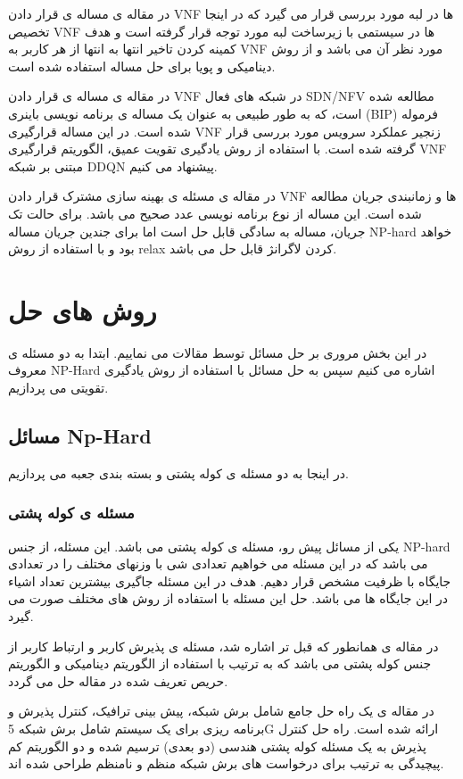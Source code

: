 در مقاله ی
\cite{cziva2018dynamic}
مساله ی قرار دادن VNF ها در لبه مورد بررسی قرار می گیرد که در اینجا تخصیص VNF ها در سیستمی با زیرساخت لبه مورد توجه قرار گرفته است و هدف کمینه کردن تاخیر انتها به انتها از هر کاربر به VNF مورد نظر آن می باشد و از روش دینامیکی و پویا برای حل مساله استفاده شده است. 

در مقاله ی
\cite{pei2019optimal}
مساله ی قرار دادن VNF در شبکه های فعال SDN/NFV مطالعه شده است، که به طور طبیعی به عنوان یک مساله ی برنامه نویسی باینری (BIP) فرموله شده است. 
در این مساله قرارگیری VNF زنجیر عملکرد سرویس مورد بررسی قرار گرفته شده است. 
با استفاده از روش یادگیری تقویت عمیق، الگوریتم قرارگیری VNF مبتنی بر شبکه DDQN  پیشنهاد می کنیم.

در مقاله ی
\cite{ren2020joint}
 مسئله ی بهینه سازی مشترک قرار دادن VNF ها و زمانبندی جریان مطالعه شده است.
 این مساله از نوع برنامه نویسی عدد صحیح می باشد.
 برای حالت تک جریان، مساله به سادگی قابل حل است اما برای جندین جریان مساله
 NP-hard
 خواهد بود و با استفاده از روش relax کردن لاگرانژ
 قابل حل می باشد.
\section{روش های حل}
در این بخش مروری بر حل مسائل توسط مقالات می نماییم.
ابتدا به دو مسئله ی معروف NP-Hard
اشاره می کنیم سپس به حل مسائل با استفاده از روش یادگیری تقویتی می پردازیم.
\subsection{مسائل Np-Hard}
در اینجا به دو مسئله ی کوله پشتی و بسته بندی جعبه می پردازیم.
\subsubsection{ مسئله ی کوله پشتی }
یکی از مسائل پیش رو، مسئله ی کوله پشتی 
می باشد.
این مسئله، از جنس NP-hard
می باشد که در این مسئله می خواهیم تعدادی شی با وزنهای مختلف را در تعدادی جایگاه با ظرفیت مشخص قرار دهیم.
هدف در این مسئله جاگیری بیشترین تعداد اشیاء در این جایگاه ها می باشد.
حل این مسئله با استفاده از روش های مختلف صورت می گیرد.

در مقاله ی \cite{lee2018dynamic}
همانطور که قبل تر اشاره شد، مسئله ی پذیرش کاربر و ارتباط کاربر از جنس کوله پشتی
 می باشد که به ترتیب با استفاده از الگوریتم دینامیکی و الگوریتم حریص تعریف شده در مقاله
 حل می گردد.

در مقاله ی
\cite{sciancalepore2017mobile}
یک راه حل جامع شامل برش شبکه، پیش بینی ترافیک، کنترل پذیرش و برنامه ریزی برای یک سیستم شامل برش شبکه 5G ارائه شده است.
راه حل کنترل پذیرش به یک مسئله کوله پشتی هندسی (دو بعدی) ترسیم شده و دو الگوریتم کم پیچیدگی به ترتیب برای درخواست های برش شبکه منظم و نامنظم طراحی شده اند.
